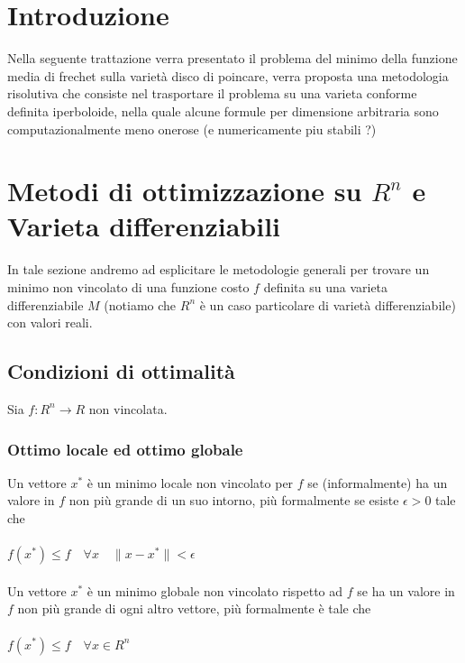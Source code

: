 \documentclass[a4paper, 12pt]{article}
\begin{document}
\renewcommand{\contentsname}{Contenuti}
\tableofcontents

\newpage

\section{Introduzione}
Nella seguente trattazione verra presentato il problema del minimo della funzione media di frechet sulla varietà disco di poincare, verra proposta una metodologia risolutiva che consiste nel trasportare il problema su una varieta conforme definita iperboloide, nella quale alcune formule per dimensione arbitraria sono computazionalmente meno onerose (e numericamente piu stabili ?)

\section{Metodi di ottimizzazione su $R^n$ e Varieta differenziabili}
In tale sezione andremo ad esplicitare le metodologie generali per trovare un minimo non vincolato di una funzione costo $f$ definita su una varieta differenziabile $M$ (notiamo che $R^n$ è un caso particolare di varietà differenziabile) con valori reali.


\subsection{Condizioni di ottimalità}
Sia $f:R^n \to R$ non vincolata.

\subsubsection{Ottimo locale ed ottimo globale}
Un vettore $x^\ast$ è un minimo locale non vincolato per $f$ se (informalmente) ha un valore in $f$ non più grande di un suo intorno, più formalmente se esiste $\epsilon > 0$ tale che\\\\
$f(x^\ast) \leq f \quad \forall x \quad \parallel x - x^\ast \parallel < \epsilon$\\\\
Un vettore $x^\ast$ è un minimo globale non vincolato rispetto ad $f$ se ha un valore in $f$ non più grande di ogni altro vettore, più formalmente è tale che\\\\
$f(x^\ast) \leq f \quad \forall x \in R^n$\\\\
\end{document}
